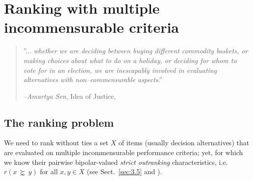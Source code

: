 \chapter{Ranking with multiple incommensurable criteria}
\label{sec:8}


\begin{quotation}''... \emph{whether we are deciding between buying different commodity baskets, or making choices about what to do on a holiday, or deciding for whom to vote for in an election, we are inescapably involved in evaluating alternatives with non–commensurable aspects}.''

  --\emph{Amartya Sen}, Idea of Justice, \citep{SEN-2009}
\end{quotation}
\vspace{1cm}


\section{The ranking problem}
\label{sec:8.1}

We need to rank without ties a set $X$ of items (usually decision alternatives) that are evaluated on multiple incommensurable performance criteria; yet, for which we know their pairwise bipolar-valued \emph{strict outranking} characteristics, i.e. $r(x\, \succnsim \, y)$ for all $x, y \in X$ (see Sect.~\ref{sec:3.5} and \citep{BIS-2013}).

